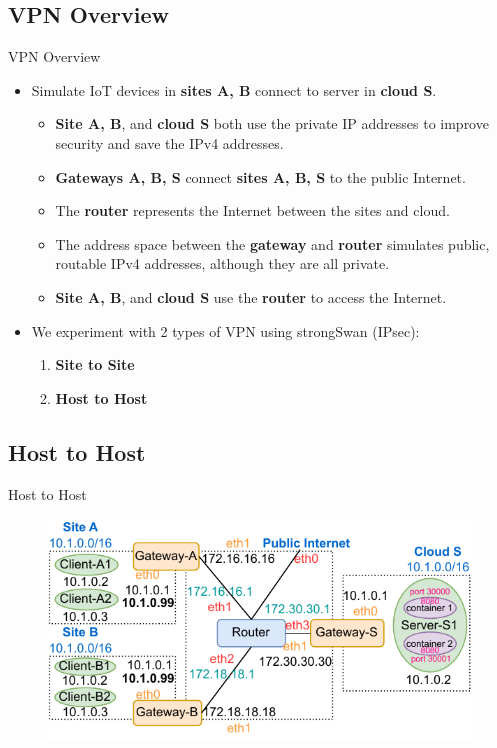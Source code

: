 \documentclass{beamer}
\begin{document}
\subsection{VPN Overview}
\begin{frame}{VPN Overview}
\begin{itemize}
\item Simulate IoT devices in \textbf{sites A, B} connect to server in \textbf{cloud S}.
\begin{itemize}
    \item \textbf{Site A, B}, and \textbf{cloud S} both use the private IP addresses to improve security and save the IPv4 addresses.
    \item \textbf{Gateways A, B, S} connect \textbf{sites A, B, S} to the public Internet.
    \item The \textbf{router} represents the Internet between the sites and cloud.
    \item The address space between the \textbf{gateway} and \textbf{router} simulates public, routable IPv4 addresses, although they are all private.
    \item \textbf{Site A, B}, and \textbf{cloud S} use the \textbf{router} to access the Internet.
\end{itemize}
\item We experiment with 2 types of VPN using strongSwan (IPsec):
\begin{enumerate}
    \item \textbf{Site to Site}
    \item \textbf{Host to Host}
\end{enumerate}
\end{itemize}
\end{frame}

\subsection{Host to Host}
\begin{frame}{Host to Host}
\begin{figure}[t!]
  \begin{center}
    \includegraphics[scale=1]{figures/host-to-host.pdf}
    \label{fig:host2host}
  \end{center}
\end{figure}
\end{frame}
\end{document}
